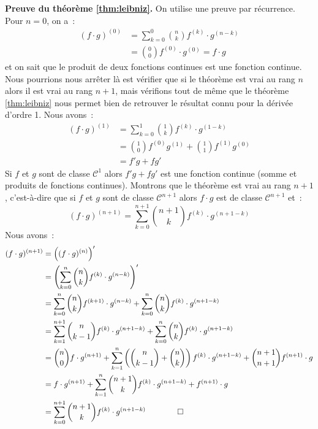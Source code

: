 \documentclass[10pt,notheorems]{beamer}
\theoremstyle{plain}
\theoremstyle{definition} %
\begin{document}
\begin{notes}

  \textbf{Preuve du théorème \hyperlink{slide_derivees_ordre_n_4}{\ref{thm:leibniz}}.} On utilise une preuve par récurrence. Pour $n=0$, on a~:
  \[
    \begin{split}
      (f\cdot g)^{(0)} &= \sum_{k=0}^0 \binom{n}{k}f^{(k)}\cdot g^{(n-k)}\\
      &= \binom{0}{0}f^{(0)}\cdot g^{(0)} = f \cdot g
    \end{split}
  \]
  et on sait que le produit de deux fonctions continues est une fonction continue. Nous pourrions nous arrêter là est vérifier que si le théorème est vrai au rang $n$ alors il est vrai au rang $n+1$, mais vérifions tout de même que le théorème \hyperlink{slide_derivees_ordre_n_4}{\ref{thm:leibniz}} nous permet bien de retrouver le résultat connu pour la dérivée d'ordre 1. Nous avons~:
  \[
    \begin{split}
      (f\cdot g)^{(1)} &= \sum_{k=0}^1 \binom{1}{k}f^{(k)}\cdot g^{(1-k)}\\
      &= \binom{1}{0}f^{(0)}g^{(1)}+\binom{1}{1}f^{(1)}g^{(0)}\\
      &= f'g+fg'
    \end{split}
  \]
  Si $f$ et $g$ sont de classe $\mathcal C^1$ alors $f'g+fg'$ est une fonction continue (somme et produits de fonctions continues). Montrons que le théorème est vrai au rang $n+1$, c'est-à-dire que si $f$ et $g$ sont de classe $\mathcal C^{n+1}$ alors $f\cdot g$ est de classe $\mathcal C^{n+1}$ et~:
  \[
    (f\cdot g)^{(n+1)} = \sum_{k=0}^{n+1} \binom{n+1}{k}f^{(k)}\cdot g^{(n+1-k)}
  \]
  Nous avons~:
  \[
    \begin{split}
      (f\cdot g)^{(n+1)} &= \left((f\cdot g)^{(n)}\right)'\\
      &= \left(\sum_{k=0}^{n} \binom{n}{k}f^{(k)}\cdot g^{(n-k)}\right)'\\
      &= \sum_{k=0}^{n} \binom{n}{k}f^{(k+1)}\cdot g^{(n-k)}+ \sum_{k=0}^{n}\binom{n}{k}f^{(k)}\cdot g^{(n+1-k)}\\
      &= \sum_{k=1}^{n+1} \binom{n}{k-1}f^{(k)}\cdot g^{(n+1-k)}+ \sum_{k=0}^{n}\binom{n}{k}f^{(k)}\cdot g^{(n+1-k)}\\
      &= \binom{n}{0}f\cdot g^{(n+1)} + \sum_{k=1}^n\left(\binom{n}{k-1}+\binom{n}{k}\right)f^{(k)}\cdot g^{(n+1-k)} + \binom{n+1}{n+1}f^{(n+1)}\cdot g\\
      &= f\cdot g^{(n+1)} + \sum_{k=1}^n\binom{n+1}{k}f^{(k)}\cdot g^{(n+1-k)} + f^{(n+1)}\cdot g\\
      &= \sum_{k=0}^{n+1}\binom{n+1}{k}f^{(k)}\cdot g^{(n+1-k)}\quad\quad \qed
    \end{split}
  \]

\end{notes}
\end{document}
